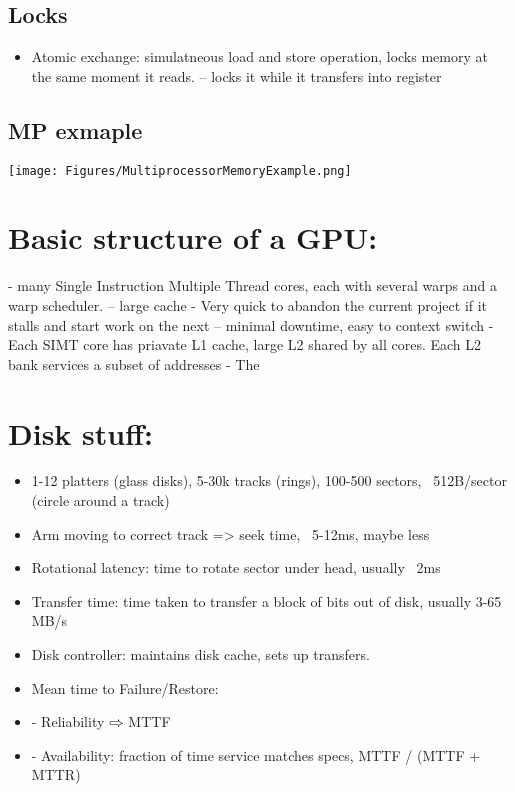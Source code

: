 \documentclass[letterpaper,landscape]{article}
\begin{document}
\begin{multicols}{2}
\subsection*{Locks}
\begin{itemize}
	\item Atomic exchange: simulatneous load and store operation, locks memory at the same moment it reads. -- locks it while it transfers into register
\end{itemize}
\subsection*{MP exmaple}
\begin{Figure}
	\centering
	\texttt{[image: Figures/MultiprocessorMemoryExample.png]}
\end{Figure}


\section{Basic structure of a GPU:}
\begin{itemize}
  - many Single Instruction Multiple Thread cores, each with several warps and a warp scheduler. -- large cache
  - Very quick to abandon the current project if it stalls and start work on the next -- minimal downtime, easy to context switch
  - Each SIMT core has priavate L1 cache, large L2 shared by all cores. Each L2 bank services a subset of addresses
  - The 
\end{itemize}


\section{Disk stuff:}
\begin{itemize}
	\item 1-12 platters (glass disks), 5-30k tracks (rings), 100-500 sectors, ~512B/sector (circle around a track)
	\item Arm moving to correct track => seek time, ~5-12ms, maybe less
	\item Rotational latency: time to rotate sector under head, usually ~2ms
	\item Transfer time: time taken to transfer a block of bits out of disk, usually 3-65 MB/s
	\item Disk controller: maintains disk cache, sets up transfers.
	\item Mean time to Failure/Restore:
	\item- Reliability $\rightwhitearrow$ MTTF
	\item- Availability: fraction of time service matches specs, MTTF / (MTTF + MTTR)
\end{itemize}



\end{multicols}
\end{document}
